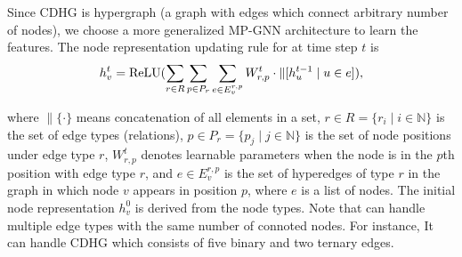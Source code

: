

Since CDHG is hypergraph (a graph with edges which connect arbitrary number of nodes), we choose a more generalized MP-GNN architecture \hyperedgeGNN to learn the features.
The node representation updating rule for \hyperedgeGNN at time step $t$ is
\begin{equation}\label{eq:hyperedge-GNN-definition}
  h_{v}^{t} = {\rm ReLU}(\sum_{r\in R}\sum_{p\in P_{r}}
  \sum_{e \in E_v^{r,p}}
  W_{r,p}^{t}\cdot \| [ h_{u}^{t-1}\mid u\in e ] ),
\end{equation}


where $\| \{\cdot \}$ means concatenation of all elements in a set, 
$r \in R = \{ r_i \mid i \in \mathbb{N} \}$ is the set of edge types (relations), 
$p \in P_{r} = \{ p_{j} \mid j\in \mathbb{N} \}$ is the set of node positions under edge type $r$,
$W_{r,p}^{t}$ denotes learnable parameters when the node is in the $p$th position with edge type $r$, and  $e\in E_v^{r,p}$ is the set of hyperedges of type $r$ in the graph in which node $v$ appears in position $p$, where
$e$ is a list of nodes.
The initial node representation $h_{v}^{0}$ is derived from the node types. Note that \hyperedgeGNN can handle multiple edge types with the same number of connoted nodes. For instance, It can handle CDHG which consists of five binary and two ternary edges.




